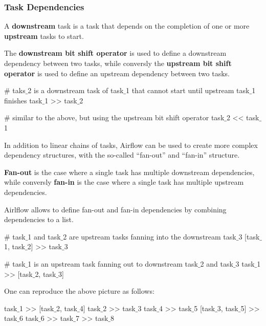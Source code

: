 \subsubsection{Task Dependencies}

A \textbf{downstream} task is a task that depends on the completion of one or more \textbf{upstream} tasks to start.
\ed

The \textbf{downstream bit shift operator} \code{$\gg$} is used to define a downstream dependency between two tasks,
while conversly the \textbf{upstream bit shift operator} \code{$\ll$} is used to define an upstream dependency between
two tasks.
\ed

\be
\begin{block}
# taks$\_$2 is a downstream task of task$\_$1 that cannot start until upstream task$\_$1 finishes
task$\_$1 >> task$\_$2

# similar to the above, but using the upstream bit shift operator
task$\_$2 << task$\_$1
\end{block}
\ee

In addition to linear chains of tasks, Airflow can be used to create more complex dependency structures, with the
so-called ``fan-out'' and ``fan-in'' structure.

\textbf{Fan-out} is the case where a single task has multiple downstream dependencies, while conversly \textbf{fan-in}
is the case where a single task has multiple upstream dependencies.
\ed

Airlflow allows to define fan-out and fan-in dependencies by combining dependencies to a list.

\be
\begin{block}
# task$\_$1 and task$\_$2 are upstream tasks fanning into the downstream task$\_$3
[task$\_$1, task$\_$2] >> task$\_$3

# task$\_$1 is an upstream task fanning out to downstream task$\_$2 and task$\_$3
task$\_$1 >> [task$\_$2, task$\_$3]
\end{block}
\ee

\be
{}

One can reproduce the above picture as follows:
\begin{block}
task$\_$1 >> [task$\_$2, task$\_$4]
task$\_$2 >> task$\_$3
task$\_$4 >> task$\_$5
[task$\_$3, task$\_$5] >> task$\_$6
task$\_$6 >> task$\_$7 >> task$\_$8
\end{block}
\ee

